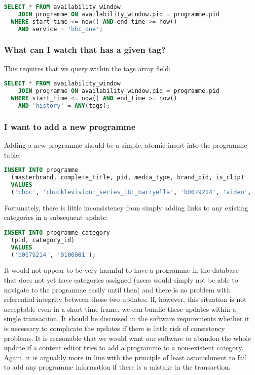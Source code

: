 \documentclass[11pt,a4paper]{article}
\begin{document}
\begin{lstlisting}[language=SQL]
  SELECT * FROM availability_window
    JOIN programme ON availability_window.pid = programme.pid
  WHERE start_time <= now() AND end_time >= now()
    AND service = 'bbc_one';
\end{lstlisting}

\subsubsection{What can I watch that has a given tag?}

This requires that we query within the tags array field:

\begin{lstlisting}[language=SQL]
  SELECT * FROM availability_window
    JOIN programme ON availability_window.pid = programme.pid
  WHERE start_time <= now() AND end_time >= now()
    AND 'history' = ANY(tags);
\end{lstlisting}

\subsubsection{I want to add a new programme}

Adding a new programme should be a simple, atomic insert into the programme
table:

\begin{lstlisting}[language=SQL]
  INSERT INTO programme
  (masterbrand, complete_title, pid, media_type, brand_pid, is_clip)
  VALUES
  ('cbbc', 'chucklevision:_series_18:_barryella', 'b0079214', 'video', 'b006w487', '0');
\end{lstlisting}

Fortunately, there is little inconsistency from simply adding links
to any existing categories in a subsequent update:

\begin{lstlisting}[language=SQL]
  INSERT INTO programme_category
  (pid, category_id)
  VALUES
  ('b0079214', '9100001');
\end{lstlisting}

It would not appear to be very harmful to have a programme in the database
that does not yet have categories assigned (users would simply not be able to
navigate to the programme easily until then) and there is no problem
with referential integrity between those two updates. If, however,
this situation is not acceptable even in a short time frame, we can bundle
these updates within a single transaction. It should be discussed in the
software requirements whether it is necessary to complicate the updates
if there is little risk of consistency problems. It is reasonable that
we would want our software to abandon the whole update if a content
editor tries to add a programme to a non-existent category. Again,
it is arguably more in line with the principle of least astonishment to
fail to add any programme information if there is a mistake in the transaction.
\end{document}
